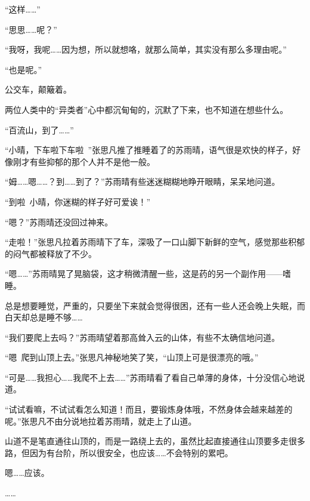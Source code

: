 “这样……”

“思思……呢？”

“我呀，我呢……因为想，所以就想咯，就那么简单，其实没有那么多理由呢。”

“也是呢。”

公交车，颠簸着。

两位人类中的“异类者”心中都沉甸甸的，沉默了下来，也不知道在想些什么。

“百流山，到了……”

“小晴，下车啦下车啦~”张思凡推了推睡着了的苏雨晴，语气很是欢快的样子，好像刚才有些抑郁的那个人并不是他一般。

“姆……嗯……？到……到了？”苏雨晴有些迷迷糊糊地睁开眼睛，呆呆地问道。

“到啦~小晴，你迷糊的样子好可爱诶！”

“嗯？”苏雨晴还没回过神来。

“走啦！”张思凡拉着苏雨晴下了车，深吸了一口山脚下新鲜的空气，感觉那些积郁的闷气都被释放了不少。

“嗯……”苏雨晴晃了晃脑袋，这才稍微清醒一些，这是药的另一个副作用——嗜睡。

总是想要睡觉，严重的，只要坐下来就会觉得很困，还有一些人还会晚上失眠，而白天却总是睡不够……

“我们要爬上去吗？”苏雨晴望着那高耸入云的山体，有些不太确信地问道。

“嗯~爬到山顶上去。”张思凡神秘地笑了笑，“山顶上可是很漂亮的哦。”

“可是……我担心……我爬不上去……”苏雨晴看了看自己单薄的身体，十分没信心地说道。

“试试看嘛，不试试看怎么知道！而且，要锻炼身体哦，不然身体会越来越差的呢。”张思凡不由分说地拉着苏雨晴，就走上了山道。

山道不是笔直通往山顶的，而是一路绕上去的，虽然比起直接通往山顶要多走很多路，但因为有台阶，所以很安全，也应该……不会特别的累吧。

嗯……应该。

……
